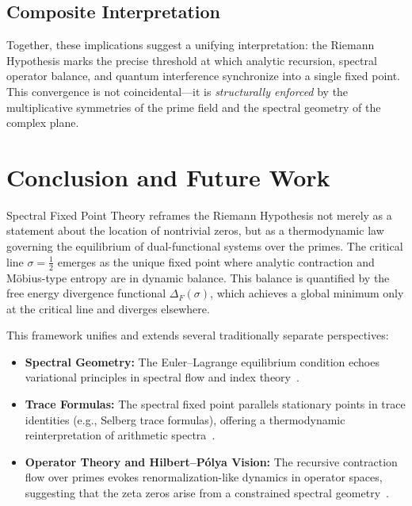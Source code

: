 \documentclass[12pt]{article}
\begin{document}
\subsection{Composite Interpretation}

Together, these implications suggest a unifying interpretation: the Riemann Hypothesis marks the precise threshold at which analytic recursion, spectral operator balance, and quantum interference synchronize into a single fixed point. This convergence is not coincidental—it is \emph{structurally enforced} by the multiplicative symmetries of the prime field and the spectral geometry of the complex plane.

\section{Conclusion and Future Work}

Spectral Fixed Point Theory reframes the Riemann Hypothesis not merely as a statement about the location of nontrivial zeros, but as a thermodynamic law governing the equilibrium of dual-functional systems over the primes. The critical line $\sigma = \tfrac{1}{2}$ emerges as the unique fixed point where analytic contraction and Möbius-type entropy are in dynamic balance. This balance is quantified by the free energy divergence functional $\Delta_F(\sigma)$, which achieves a global minimum only at the critical line and diverges elsewhere.

This framework unifies and extends several traditionally separate perspectives:
\begin{itemize}
    \item \textbf{Spectral Geometry:} The Euler–Lagrange equilibrium condition echoes variational principles in spectral flow and index theory~\cite{connes1996noncommutative}.
    
    \item \textbf{Trace Formulas:} The spectral fixed point parallels stationary points in trace identities (e.g., Selberg trace formulas), offering a thermodynamic reinterpretation of arithmetic spectra~\cite{hejhal1976selberg}.
    
    \item \textbf{Operator Theory and Hilbert–Pólya Vision:} The recursive contraction flow over primes evokes renormalization-like dynamics in operator spaces, suggesting that the zeta zeros arise from a constrained spectral geometry~\cite{odlyzko1987distribution}.
\end{itemize}
\end{document}
